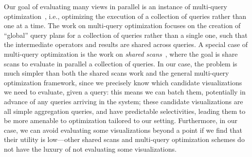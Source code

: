  Our goal of evaluating
many views in parallel is an instance of multi-query 
optimization~\cite{DBLP:journals/tods/Sellis88,DBLP:journals/pvldb/KementsietsidisNCV08,DBLP:journals/pvldb/WangC13},
i.e., optimizing the execution of a collection of queries rather
than one at a time.
The work on multi-query optimization focuses on the creation of ``global''
query plans for a collection of queries rather than a single one,
such that the intermediate operators and results are shared across queries.
A special case of multi-query optimization 
is the work on {\em shared scans}~\cite{DBLP:conf/VLDB/ZukowskiHNB07,DBLP:conf/sigmod/HollowayRSD07,DBLP:journals/pvldb/UnterbrunnerGAFK09,DBLP:conf/icde/RamanSQRDKNS08,DBLP:journals/pvldb/QiaoRRHL08},
where the goal is share scans to evaluate in parallel a collection of queries.
In our case, the problem is much simpler than both the shared scans work and 
the general multi-query optimization
framework, since we precisely know which candidate visualizations we need to evaluate,
given a query: this means we can batch them, potentially in advance of any
queries arriving in the system; these candidate visualizations are all simple
aggregation queries, and have predictable selectivities,
leading them to be more amenable to optimization tailored to our setting.
Furthermore, in our case, we can avoid evaluating some visualizations beyond a point
if we find that their utility is low---other shared scans and multi-query optimization
schemes do not have the luxury of not evaluating some visualizations.










